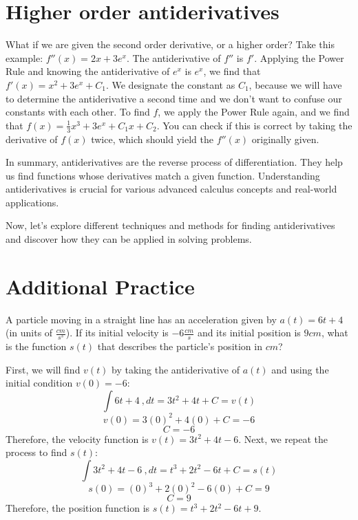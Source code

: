\section{Higher order antiderivatives}
What if we are given the second order derivative, or a higher order? 
Take this example: $f''(x) = 2x+3e^x$. The antiderivative of $f''$ is 
$f'$. Applying the Power Rule and knowing the antiderivative of $e^x$ 
is $e^x$, we find that $f'(x) = x^2 + 3e^x + C_1$. We designate the 
constant as $C_1$, because we will have to determine the antiderivative a 
second time and we don't want to confuse our constants with each other.
 To find $f$, we apply the Power Rule again, and we find that $f(x) = 
\frac{1}{3} x^3 + 3e^x + C_1x + C_2$. You can check if this is correct 
by taking the derivative of $f(x)$ twice, which should yield the 
$f''(x)$ originally given. 

In summary, antiderivatives are the reverse process of
differentiation. They help us find functions whose derivatives match a
given function. Understanding antiderivatives is crucial for various
advanced calculus concepts and real-world applications.

Now, let's explore different techniques and methods for finding
antiderivatives and discover how they can be applied in solving
problems.

\section{Additional Practice}

\begin{Exercise}[label=antideriv1]
	A particle moving in a straight line has an acceleration given by 
	$a(t) = 6t + 4$ (in units of $\frac{cm}{s^s}$). If its initial 
	velocity is $-6 \frac{cm}{s}$ and its initial position is $9 cm$, 
	what is the function $s(t)$ that describes the particle's position 
	in $cm$?
\end{Exercise}

\begin{Answer}[ref=antideriv1]
	First, we will find $v(t)$ by taking the antiderivative of $a(t)$ and 
	using the initial condition $v(0) = -6$:
	$$\int 6t + 4 \ , dt = 3t^2 + 4t + C = v(t)$$
	$$v(0) = 3(0)^2 + 4(0) + C = -6$$
	$$C = -6$$
	Therefore, the velocity function is $v(t) = 3t^2 + 4t - 6$. Next, we 
	repeat the process to find $s(t)$:
	$$\int 3t^2 + 4t - 6 \ , dt = t^3 + 2t^2 - 6t + C = s(t)$$
	$$s(0) = (0)^3 + 2(0)^2 - 6(0) + C = 9$$
	$$C = 9$$
	Therefore, the position function is $s(t) = t^3 + 2t^2 - 6t + 9$. 
\end{Answer}

